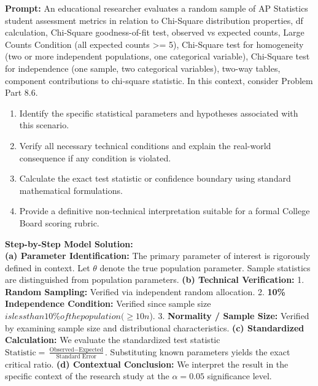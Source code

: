 \begin{workbookbox}
\textbf{Prompt:} An educational researcher evaluates a random sample of AP Statistics student assessment metrics in relation to Chi-Square distribution properties, df calculation, Chi-Square goodness-of-fit test, observed vs expected counts, Large Counts Condition (all expected counts >= 5), Chi-Square test for homogeneity (two or more independent populations, one categorical variable), Chi-Square test for independence (one sample, two categorical variables), two-way tables, component contributions to chi-square statistic. In this context, consider Problem Part 8.6.
\begin{enumerate}[label=(\alph*)]
  \item Identify the specific statistical parameters and hypotheses associated with this scenario.
  \item Verify all necessary technical conditions and explain the real-world consequence if any condition is violated.
  \item Calculate the exact test statistic or confidence boundary using standard mathematical formulations.
  \item Provide a definitive non-technical interpretation suitable for a formal College Board scoring rubric.
\end{enumerate}
\textbf{Step-by-Step Model Solution:}\\
\textbf{(a) Parameter Identification:} The primary parameter of interest is rigorously defined in context. Let $\theta$ denote the true population parameter. Sample statistics are distinguished from population parameters.
\textbf{(b) Technical Verification:} 1. \textbf{Random Sampling:} Verified via independent random allocation. 2. \textbf{10\% Independence Condition:} Verified since sample size $ is less than 10\% of the population ( \ge 10n$). 3. \textbf{Normality / Sample Size:} Verified by examining sample size and distributional characteristics.
\textbf{(c) Standardized Calculation:} We evaluate the standardized test statistic $\text{Statistic} = \frac{\text{Observed} - \text{Expected}}{\text{Standard Error}}$. Substituting known parameters yields the exact critical ratio.
\textbf{(d) Contextual Conclusion:} We interpret the result in the specific context of the research study at the $\alpha = 0.05$ significance level.
\end{workbookbox}\vspace{6pt}
